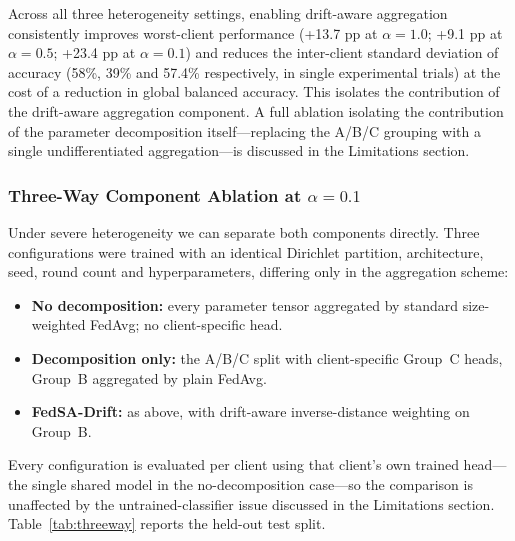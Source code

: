 \documentclass[utf8]{FrontiersinHarvard} %
\newcommand{\sadrift}{FedSA-Drift}
\begin{document}
Across all three heterogeneity settings, enabling drift-aware aggregation consistently improves worst-client performance (+13.7 pp at $\alpha{=}1.0$; +9.1 pp at $\alpha{=}0.5$; +23.4 pp at $\alpha{=}0.1$) and reduces the inter-client standard deviation of accuracy (58\%, 39\% and 57.4\% respectively, in single experimental trials) at the cost of a reduction in global balanced accuracy. This isolates the contribution of the drift-aware aggregation component. A full ablation isolating the contribution of the parameter decomposition itself---replacing the A/B/C grouping with a single undifferentiated aggregation---is discussed in the Limitations section.

\subsubsection{Three-Way Component Ablation at $\alpha = 0.1$}
\label{sec:threeway}

Under severe heterogeneity we can separate both components directly. Three configurations were trained with an identical Dirichlet partition, architecture, seed, round count and hyperparameters, differing only in the aggregation scheme:

\begin{itemize}
    \item \textbf{No decomposition:} every parameter tensor aggregated by standard size-weighted FedAvg; no client-specific head.
    \item \textbf{Decomposition only:} the A/B/C split with client-specific Group~C heads, Group~B aggregated by plain FedAvg.
    \item \textbf{\sadrift{}:} as above, with drift-aware inverse-distance weighting on Group~B.
\end{itemize}

Every configuration is evaluated per client using that client's own trained head---the single shared model in the no-decomposition case---so the comparison is unaffected by the untrained-classifier issue discussed in the Limitations section. Table~\ref{tab:threeway} reports the held-out test split.
\end{document}

